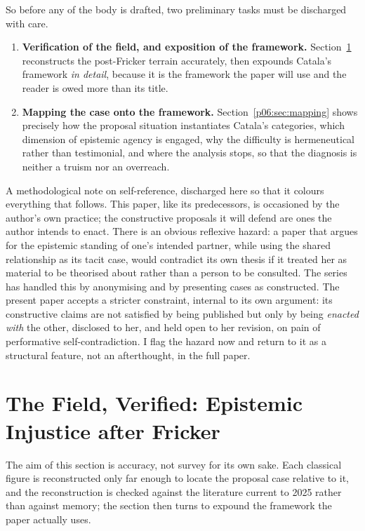 \documentclass[11pt,a4paper]{article}
\begin{document}
So before any of the body is drafted, two preliminary tasks must be discharged with care.

\begin{enumerate}
\item \textbf{Verification of the field, and exposition of the framework.} Section~\ref{p06:sec:literature} reconstructs the post-Fricker terrain accurately, then expounds Catala's framework \emph{in detail}, because it is the framework the paper will use and the reader is owed more than its title.
\item \textbf{Mapping the case onto the framework.} Section~\ref{p06:sec:mapping} shows precisely how the proposal situation instantiates Catala's categories, which dimension of epistemic agency is engaged, why the difficulty is hermeneutical rather than testimonial, and where the analysis stops, so that the diagnosis is neither a truism nor an overreach.
\end{enumerate}

A methodological note on self-reference, discharged here so that it colours everything that follows. This paper, like its predecessors, is occasioned by the author's own practice; the constructive proposals it will defend are ones the author intends to enact. There is an obvious reflexive hazard: a paper that argues for the epistemic standing of one's intended partner, while using the shared relationship as its tacit case, would contradict its own thesis if it treated her as material to be theorised about rather than a person to be consulted. The series has handled this by anonymising and by presenting cases as constructed. The present paper accepts a stricter constraint, internal to its own argument: its constructive claims are not satisfied by being published but only by being \emph{enacted with} the other, disclosed to her, and held open to her revision, on pain of performative self-contradiction. I flag the hazard now and return to it as a structural feature, not an afterthought, in the full paper.

\section{The Field, Verified: Epistemic Injustice after Fricker}\label{p06:sec:literature}

The aim of this section is accuracy, not survey for its own sake. Each classical figure is reconstructed only far enough to locate the proposal case relative to it, and the reconstruction is checked against the literature current to 2025 rather than against memory; the section then turns to expound the framework the paper actually uses.
\end{document}
